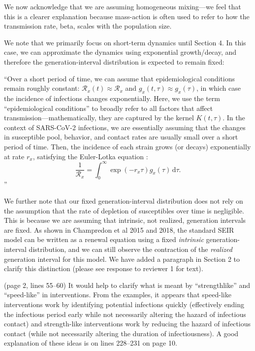 \documentclass[12pt]{article}
\newcommand{\RR}{\ensuremath{{\mathcal R}}\xspace}
\newcommand{\dd}[1]{\ensuremath{\, \mathrm{d}#1}}
\newcommand{\dtau}{\dd{\tau}}
\newcommand{\revtext}{\textsf}
\begin{document}
We now acknowledge that we are assuming homogeneous mixing---we feel that this is a clearer explanation because mass-action is often used to refer to how the transmission rate, beta, scales with the population size.

We note that we primarily focus on short-term dynamics until Section 4.
In this case, we can approximate the dynamics using exponential growth/decay, and therefore the generation-interval distribution is expected to remain fixed:

``Over a short period of time, we can assume that epidemiological conditions remain roughly constant: $\RR_x(t) \approx \RR_x$ and $g_x(t, \tau) \approx g_x(\tau)$, in which case the incidence of infections changes exponentially.
Here, we use the term ``epidemiological conditions'' to broadly refer to all factors that affect transmission---mathematically, they are captured by the kernel $K(t, \tau)$.
In the context of SARS-CoV-2 infections, we are essentially assuming that the changes in susceptible pool, behavior, and contact rates are usually small over a short period of time.
Then, the incidence of each strain grows (or decays) exponentially at rate $r_x$, satisfying the Euler-Lotka equation \citep{wallinga2007generation}:
\begin{equation}
\frac{1}{\RR_x} = \int_0^\infty \exp(- r_x \tau) g_x(\tau) \dtau.
\end{equation}''

We further note that our fixed generation-interval distribution does not rely on the assumption that the rate of depletion of susceptibles over time is negligible.
This is because we are assuming that intrinsic, not realized, generation intervals are fixed.
As shown in Champredon et al 2015 and 2018, the standard SEIR model can be written as a renewal equation using a fixed \emph{intrinsic} generation-interval distribution, and we can still observe the contraction of the \emph{realized} generation interval for this model.
We have added a paragraph in Section 2 to clarify this distinction (please see response to reviewer 1 for text).

\revtext{(page 2, lines 55–60) It would help to clarify what is meant by “strengthlike” and “speed-like” in interventions. From the examples, it appears that
speed-like interventions work by identifying potential infections quickly
(effectively ending the infectious period early while not necessarily altering
the hazard of infectious contact) and strength-like interventions work by
reducing the hazard of infectious contact (while not necessarily altering
the duration of infectiousness). A good explanation of these ideas is on
lines 228–231 on page 10.}
\end{document}
